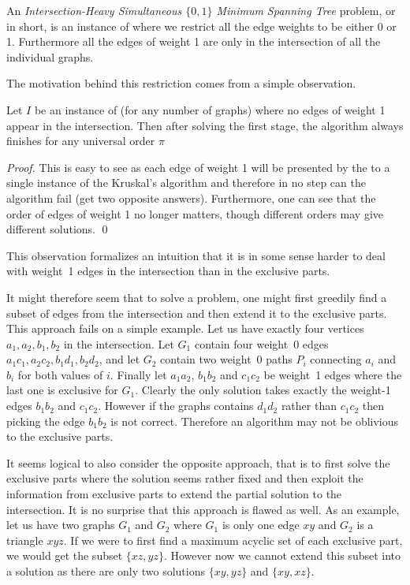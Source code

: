 \begin{definition}
An {\em Intersection-Heavy Simultaneous $\{0,1\}$ Minimum Spanning Tree} problem, or \POISMST in short, is an instance of \SMST where we restrict all the edge weights to be either 0 or 1. Furthermore all the edges of weight 1 are only in the intersection of all the individual graphs. 
\end{definition}

The motivation behind this restriction comes from a simple observation. 

\begin{observation}\label{obs:PIOSMST}
Let $I$ be an instance of \OISMST (for any number of graphs) where no edges of weight 1 appear in the intersection. Then after solving the first stage, the \SKA algorithm always finishes for any universal order $\pi$
\end{observation}
\begin{proof}
This is easy to see as each edge of weight 1 will be presented by the \SKA to a single instance of the Kruskal's algorithm and therefore in no step can the algorithm fail (get two opposite answers). Furthermore, one can see that the order of edges of weight 1 no longer matters, though different orders may give different solutions. \qed
\end{proof}

This observation formalizes an intuition that it is in some sense harder to deal with weight~1 edges in the intersection than in the exclusive parts. 

It might therefore seem that to solve a \OISMST problem, one might first greedily find a subset of edges from the intersection and then extend it to the exclusive parts. This approach fails on a simple example. Let us have exactly four vertices $a_1,a_2,b_1,b_2$ in the intersection. Let $G_1$ contain four weight~0 edges $a_1c_1, a_2c_2, b_1d_1, b_2d_2$, and let $G_2$ contain two weight~0 paths $P_i$ connecting $a_i$ and $b_i$ for both values of $i$. Finally let $a_1a_2$, $b_1b_2$ and $c_1c_2$ be weight~1 edges where the last one is exclusive for $G_1$. Clearly the only solution takes exactly the weight-1 edges $b_1b_2$ and $c_1c_2$. However if the graphs contains $d_1d_2$ rather than $c_1c_2$ then picking the edge $b_1b_2$ is not correct. Therefore an algorithm may not be oblivious to the exclusive parts. 
 
It seems logical to also consider the opposite approach, that is to first solve the exclusive parts where the solution seems rather fixed and then exploit the information from exclusive parts to extend the partial solution to the intersection. It is no surprise that this approach is flawed as well. As an example, let us have two graphs $G_1$ and $G_2$ where $G_1$ is only one edge $xy$ and $G_2$ is a triangle $xyz$. If we were to first find a maximum acyclic set of each exclusive part, we would get the subset $\{xz,yz\}$. However now we cannot extend this subset into a solution as there are only two solutions $\{xy,yz\}$ and $\{xy,xz\}$. 


